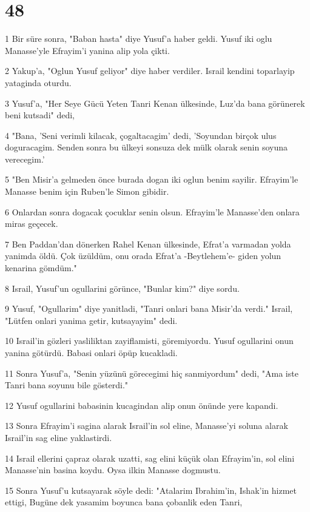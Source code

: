 \chapter{48}

\par 1 Bir süre sonra, "Baban hasta" diye Yusuf'a haber geldi. Yusuf iki oglu Manasse'yle Efrayim'i yanina alip yola çikti.
\par 2 Yakup'a, "Oglun Yusuf geliyor" diye haber verdiler. Israil kendini toparlayip yataginda oturdu.
\par 3 Yusuf'a, "Her Seye Gücü Yeten Tanri Kenan ülkesinde, Luz'da bana görünerek beni kutsadi" dedi,
\par 4 "Bana, 'Seni verimli kilacak, çogaltacagim' dedi, 'Soyundan birçok ulus doguracagim. Senden sonra bu ülkeyi sonsuza dek mülk olarak senin soyuna verecegim.'
\par 5 "Ben Misir'a gelmeden önce burada dogan iki oglun benim sayilir. Efrayim'le Manasse benim için Ruben'le Simon gibidir.
\par 6 Onlardan sonra dogacak çocuklar senin olsun. Efrayim'le Manasse'den onlara miras geçecek.
\par 7 Ben Paddan'dan dönerken Rahel Kenan ülkesinde, Efrat'a varmadan yolda yanimda öldü. Çok üzüldüm, onu orada Efrat'a -Beytlehem'e- giden yolun kenarina gömdüm."
\par 8 Israil, Yusuf'un ogullarini görünce, "Bunlar kim?" diye sordu.
\par 9 Yusuf, "Ogullarim" diye yanitladi, "Tanri onlari bana Misir'da verdi." Israil, "Lütfen onlari yanima getir, kutsayayim" dedi.
\par 10 Israil'in gözleri yasliliktan zayiflamisti, göremiyordu. Yusuf ogullarini onun yanina götürdü. Babasi onlari öpüp kucakladi.
\par 11 Sonra Yusuf'a, "Senin yüzünü görecegimi hiç sanmiyordum" dedi, "Ama iste Tanri bana soyunu bile gösterdi."
\par 12 Yusuf ogullarini babasinin kucagindan alip onun önünde yere kapandi.
\par 13 Sonra Efrayim'i sagina alarak Israil'in sol eline, Manasse'yi soluna alarak Israil'in sag eline yaklastirdi.
\par 14 Israil ellerini çapraz olarak uzatti, sag elini küçük olan Efrayim'in, sol elini Manasse'nin basina koydu. Oysa ilkin Manasse dogmustu.
\par 15 Sonra Yusuf'u kutsayarak söyle dedi: "Atalarim Ibrahim'in, Ishak'in hizmet ettigi, Bugüne dek yasamim boyunca bana çobanlik eden Tanri,
